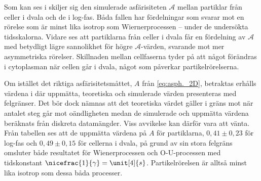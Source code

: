 Som kan ses i  skiljer sig den simulerade asfärisiteten $\mathcal{A}$ mellan partiklar från celler i dvala och de i log-fas. Båda fallen har fördelningar som svarar mot en rörelse som är minst lika isotrop som Wiernerprocessen -- under de undersökta tidsskalorna. Vidare ses att partiklarna från celler i dvala får en fördelning av $\mathcal{A}$ med betydligt lägre sannolikhet för högre $\mathcal{A}$-värden, svarande mot mer asymmetriska rörelser. Skillnaden mellan cellfaserna tyder på att något förändras i cytoplasman när cellen går i dvala, något som påverkar partikelrörelserna. 

Om istället det riktiga asfärisitetsmåttet, $A$ från \eqref{eq:asph._2D}, betraktas erhålls värdena i  där uppmätta, teoretiska och simulerade värden presenteras med felgränser. Det bör dock nämnas att det teoretiska värdet gäller i gräns mot när antalet steg går mot oändligheten medan de simulerade och uppmätta värdena beräknats från diskreta datamängder. Viss avvikelse kan därför vara att vänta. Från tabellen ses att de uppmätta värdena på $A$ för partiklarna, $0,41\pm0,23$ för log-fas och $0,49\pm0,15$ för cellerna i dvala, på grund av sin stora felgräns omsluter både resultatet för Wienerprocessen och O-U-processen med tidskonstant $\nicefrac{1}{\gamma}=\unit[4]{s}$. Partikelrörelsen är alltså minst lika isotrop som dessa båda processer.

\begin{comment}
\section{Positionskorrelation}
Genom att studera partikelpositionernas korrelation i tiden kan en karakteristisk tidsskala för rörelserna bestämmas. Denna tidsskala skulle exempelvis kunna användas tillsammans med \eqref{eq:COV_o-u} för att anpassa en Ornstein-Uhlenbeck-modell. Även om 

\subsection{Resultat -- }

\begin{figure}
\centering

\caption{Normerade autokorrelationsfunktionerna för partikelrörelser i de olika cellfaserna tillammans med exponentialanpassningar. Dessa korrelationsfunktiner har beräknats på ett sätt som är analogt med \eqref{eq:MSD_S}, alltså att korrelationsfunktionen är beräknad för varje tids\emph{steg}. Här kan man se att korrelationsfunktionerna börjar med att avta exponentiellt men sen övergår till att fortsätta neråt och bli negativa. }
\label{fig:pos_korr}
\end{figure}
\end{comment}



